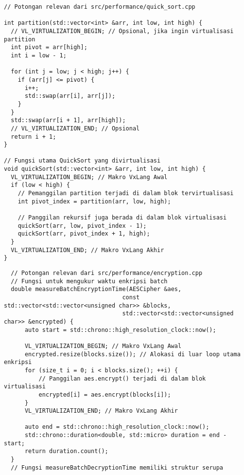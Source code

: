 \begin{verbatim}
// Potongan relevan dari src/performance/quick_sort.cpp

int partition(std::vector<int> &arr, int low, int high) {
  // VL_VIRTUALIZATION_BEGIN; // Opsional, jika ingin virtualisasi partition
  int pivot = arr[high];
  int i = low - 1;

  for (int j = low; j < high; j++) {
    if (arr[j] <= pivot) {
      i++;
      std::swap(arr[i], arr[j]);
    }
  }
  std::swap(arr[i + 1], arr[high]);
  // VL_VIRTUALIZATION_END; // Opsional
  return i + 1;
}

// Fungsi utama QuickSort yang divirtualisasi
void quickSort(std::vector<int> &arr, int low, int high) {
  VL_VIRTUALIZATION_BEGIN; // Makro VxLang Awal
  if (low < high) {
    // Pemanggilan partition terjadi di dalam blok tervirtualisasi
    int pivot_index = partition(arr, low, high); 
    
    // Panggilan rekursif juga berada di dalam blok virtualisasi
    quickSort(arr, low, pivot_index - 1);
    quickSort(arr, pivot_index + 1, high);
  }
  VL_VIRTUALIZATION_END; // Makro VxLang Akhir
}
\end{verbatim}
\label{lst:quicksort_vxlang_macros_appendix_full}

\begin{verbatim}
  // Potongan relevan dari src/performance/encryption.cpp
  // Fungsi untuk mengukur waktu enkripsi batch
  double measureBatchEncryptionTime(AESCipher &aes,
                                  const std::vector<std::vector<unsigned char>> &blocks,
                                  std::vector<std::vector<unsigned char>> &encrypted) {
      auto start = std::chrono::high_resolution_clock::now();
      
      VL_VIRTUALIZATION_BEGIN; // Makro VxLang Awal
      encrypted.resize(blocks.size()); // Alokasi di luar loop utama enkripsi
      for (size_t i = 0; i < blocks.size(); ++i) {
          // Panggilan aes.encrypt() terjadi di dalam blok virtualisasi
          encrypted[i] = aes.encrypt(blocks[i]); 
      }
      VL_VIRTUALIZATION_END; // Makro VxLang Akhir
      
      auto end = std::chrono::high_resolution_clock::now();
      std::chrono::duration<double, std::micro> duration = end - start;
      return duration.count();
  }
  // Fungsi measureBatchDecryptionTime memiliki struktur serupa
\end{verbatim}
\label{lst:aes_vxlang_macros_appendix_full}

